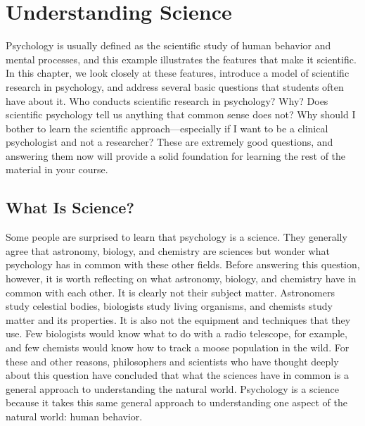 \section{Understanding Science}


Psychology is usually defined as the scientific study of human behavior and mental processes, and this example illustrates the features that make it scientific. In this chapter, we look closely at these features, introduce a model of scientific research in psychology, and address several basic questions that students often have about it. Who conducts scientific research in psychology? Why? Does scientific psychology tell us anything that common sense does not? Why should I bother to learn the scientific approach---especially if I want to be a clinical psychologist and not a researcher? These are extremely good questions, and answering them now will provide a solid foundation for learning the rest of the material in your course.

\subsection{What Is Science?}
Some people are surprised to learn that psychology is a science. They generally agree that astronomy, biology, and chemistry are sciences but wonder what psychology has in common with these other fields. Before answering this question, however, it is worth reflecting on what astronomy, biology, and chemistry have in common with each other. It is clearly not their subject matter. Astronomers study celestial bodies, biologists study living organisms, and chemists study matter and its properties. It is also not the equipment and techniques that they use. Few biologists would know what to do with a radio telescope, for example, and few chemists would know how to track a moose population in the wild. For these and other reasons, philosophers and scientists who have thought deeply about this question have concluded that what the sciences have in common is a general approach to understanding the natural world. Psychology is a science because it takes this same general approach to understanding one aspect of the natural world: human behavior.

